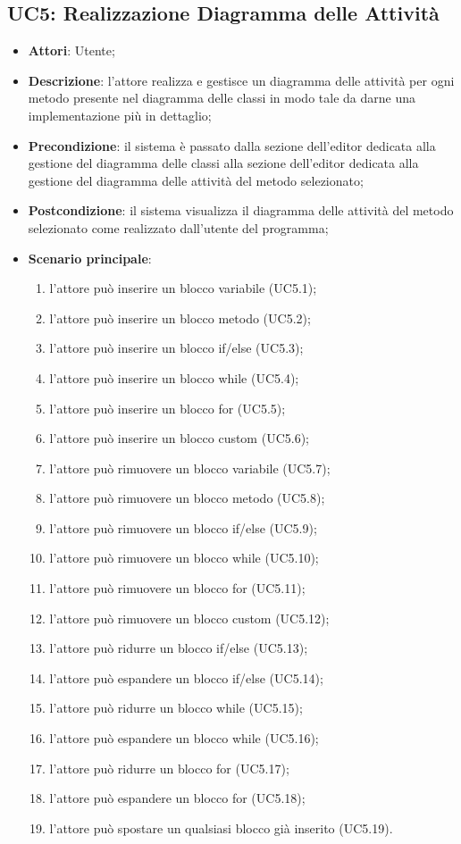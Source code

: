 \subsection{UC5: Realizzazione Diagramma delle Attività}
\label{UC5}
\begin{itemize}
\item \textbf{Attori}: Utente;
\item \textbf{Descrizione}: l'attore realizza e gestisce un diagramma delle attività per ogni metodo presente nel diagramma delle classi in modo tale da darne una implementazione più in dettaglio;	
\item \textbf{Precondizione}: il sistema è passato dalla sezione dell'editor dedicata alla gestione del diagramma delle classi alla sezione dell'editor dedicata alla gestione del diagramma delle attività del metodo selezionato;	
\item \textbf{Postcondizione}: il sistema visualizza il diagramma delle attività del metodo selezionato come realizzato dall'utente del programma;
\item \textbf{Scenario principale}:
\begin{enumerate}
\item l'attore può inserire un blocco variabile (UC5.1);
\item l'attore può inserire un blocco metodo (UC5.2);
\item l'attore può inserire un blocco if/else (UC5.3);
\item l'attore può inserire un blocco while (UC5.4);
\item l'attore può inserire un blocco for (UC5.5);
\item l'attore può inserire un blocco custom (UC5.6);
\item l'attore può rimuovere un blocco variabile (UC5.7);
\item l'attore può rimuovere un blocco metodo (UC5.8);
\item l'attore può rimuovere un blocco if/else (UC5.9);
\item l'attore può rimuovere  un blocco while (UC5.10);
\item l'attore può rimuovere un blocco for (UC5.11);
\item l'attore può rimuovere un blocco custom (UC5.12);
\item l'attore può ridurre un blocco if/else (UC5.13);
\item l'attore può espandere un blocco if/else (UC5.14);
\item l'attore può ridurre un blocco while (UC5.15);
\item l'attore può espandere un blocco while (UC5.16);
\item l'attore può ridurre un blocco for (UC5.17);
\item l'attore può espandere un blocco for (UC5.18);
\item l'attore può spostare un qualsiasi blocco già inserito (UC5.19).
\end{enumerate}
\end{itemize}

